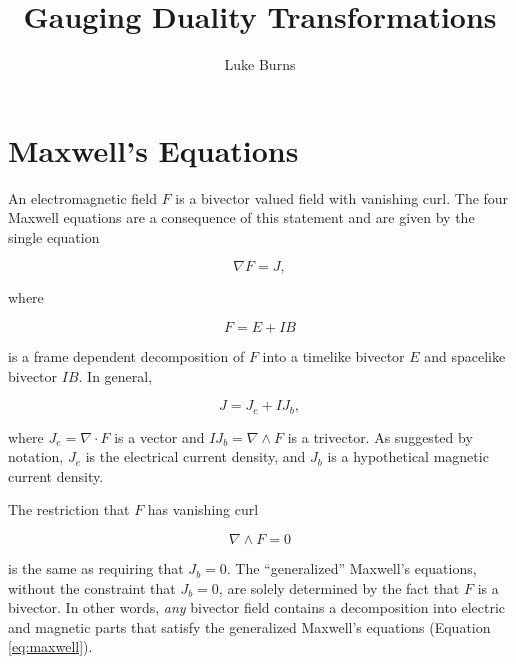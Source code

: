 \documentclass{article}
\title{Gauging Duality Transformations}
\author{Luke Burns}
\begin{document}
  \maketitle


  \section{Maxwell's Equations}

  An electromagnetic field $F$ is a bivector valued field with vanishing curl. The four Maxwell equations are a consequence of this statement and are given by the single equation\cite{gap}

  \begin{equation}
    \nabla F = J,\label{eq:maxwell}
  \end{equation}

  where 

  \begin{equation}
    F = E + I B
  \end{equation}

  is a frame dependent decomposition of $F$ into a timelike bivector $E$ and spacelike bivector $IB$. In general, 

  \begin{equation}
    J = J_e + I J_b,\label{eq:current}
  \end{equation}

  where $J_e = \nabla \cdot F$ is a vector and $I J_b = \nabla \wedge F$ is a trivector. As suggested by notation, $J_e$ is the electrical current density, and $J_b$ is a hypothetical magnetic current density.

  The restriction that $F$ has vanishing curl

  \begin{equation}
    \nabla \wedge F = 0\label{eq:constraint}
  \end{equation}

  is the same as requiring that $J_b = 0$. The ``generalized'' Maxwell's equations, without the constraint that $J_b=0$, are solely determined by the fact that $F$ is a bivector. In other words, \emph{any} bivector field contains a decomposition into electric and magnetic parts that satisfy the generalized Maxwell's equations (Equation \ref{eq:maxwell}).
\end{document}
